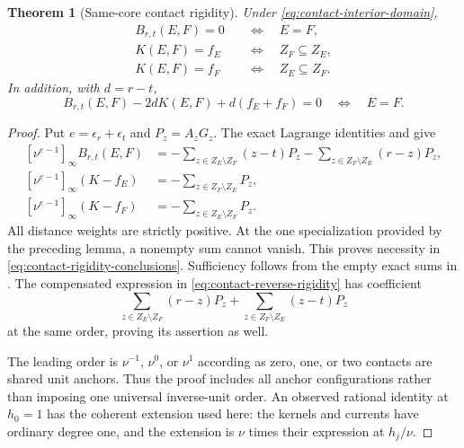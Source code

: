 \documentclass[11pt,a4paper]{amsart}
\numberwithin{equation}{section}
\theoremstyle{plain}
\newtheorem{theorem}{Theorem}[section]
\theoremstyle{definition}
\begin{document}
\begin{theorem}[Same-core contact rigidity]\label{thm:contact-rigidity}
Under \eqref{eq:contact-interior-domain},
\begin{equation}
\begin{aligned}
 B_{r,t}(E,F)=0&\quad\Longleftrightarrow\quad E=F,\\
 K(E,F)=f_E&\quad\Longleftrightarrow\quad Z_F\subseteq Z_E,\\
 K(E,F)=f_F&\quad\Longleftrightarrow\quad Z_E\subseteq Z_F.
\end{aligned}
 \label{eq:contact-rigidity-conclusions}
\end{equation}
In addition, with \(d=r-t\),
\begin{equation}\label{eq:contact-reverse-rigidity}
 B_{r,t}(E,F)-2dK(E,F)+d(f_E+f_F)=0
 \quad\Longleftrightarrow\quad E=F.
\end{equation}
\end{theorem}
\begin{proof}
Put \(e=\epsilon_r+\epsilon_t\) and \(P_z=A_zG_z\).  The exact Lagrange
identities and  give
\begin{equation}
\begin{aligned}
 [\nu^{e-1}]_\infty B_{r,t}(E,F)
   &=-\sum_{z\in Z_E\setminus Z_F}(z-t)P_z
     -\sum_{z\in Z_F\setminus Z_E}(r-z)P_z,\\
 [\nu^{e-1}]_\infty(K-f_E)&=-\sum_{z\in Z_F\setminus Z_E}P_z,\\
 [\nu^{e-1}]_\infty(K-f_F)&=-\sum_{z\in Z_E\setminus Z_F}P_z.
\end{aligned}
 \label{eq:contact-first-coefficients}
\end{equation}
All distance weights are strictly positive.  At the one specialization
provided by the preceding lemma, a nonempty sum cannot vanish.  This
proves necessity in \eqref{eq:contact-rigidity-conclusions}.  Sufficiency
follows from the empty exact sums in .
The compensated expression in \eqref{eq:contact-reverse-rigidity} has
coefficient
\[
 \sum_{z\in Z_E\setminus Z_F}(r-z)P_z
 +\sum_{z\in Z_F\setminus Z_E}(z-t)P_z
\]
at the same order, proving its assertion as well.

The leading order is \(\nu^{-1}\), \(\nu^0\), or \(\nu^1\) according as zero,
one, or two contacts are shared unit anchors.  Thus the proof includes all
anchor configurations rather than imposing one universal inverse-unit
order.  An observed rational identity at \(h_0=1\) has the coherent
extension used here: the kernels and currents have ordinary degree one,
and the extension is \(\nu\) times their expression at \(h_j/\nu\).
\end{proof}
\end{document}
